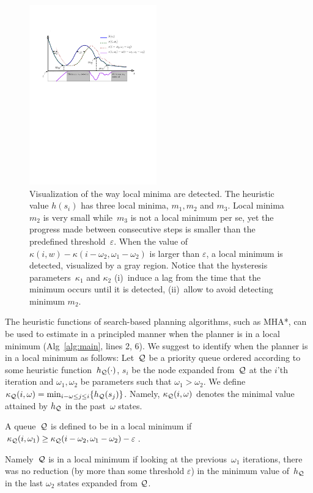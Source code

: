 \documentclass[conference]{IEEEtran}
\begin{document}
\begin{figure}[tb]
  \centering
  	\includegraphics[width=0.49\textwidth]{fig/local_min_detection_4.pdf}
  	\vspace{-5mm}
  \caption{
		Visualization of the way local minima are detected.
		The heuristic value $h(s_i)$ has three local minima, $m_1, m_2$ and $m_3$.
		Local minima $m_2$ is very small while~$m_3$ is not a local minimum per se, yet the progress made between consecutive steps is smaller than the predefined threshold~$\varepsilon$.
		When the value of $\kappa(i,w) -  \kappa(i-\omega_2,\omega_1-\omega_2)$ is larger than $\varepsilon$, a local minimum is detected, visualized by a gray region.
		Notice that the hysteresis parameters~$\kappa_1$ and $\kappa_2$ 
		(i)~induce a lag from the time that the minimum occurs until it is detected,
		(ii)~allow to avoid detecting minimum $m_2$.		
  	}
   	\label{fig:robot}
  	\vspace{-5mm}
\end{figure}

The heuristic functions of search-based planning algorithms, such as MHA*, can be used to estimate in a principled manner when the planner is in a local minimum (Alg~\ref{alg:main}, lines 2, 6). 
%
We suggest to identify when the planner is in a local minimum as follows:
Let~$\mathcal{Q}$ be a priority queue 
ordered according to some heuristic function~$h_{\mathcal{Q}}(\cdot)$,
$s_i$ be the node expanded from~$\mathcal{Q}$ at the $i$'th iteration and $\omega_1, \omega_2$ be parameters such that $\omega_1 > \omega_2$.
%
We define 
$\kappa_{\mathcal{Q}}(i, \omega) = \min_{i-\omega \leq j \leq i} \{ h_{\mathcal{Q}}(s_j)\}$.
Namely, $\kappa_{\mathcal{Q}}(i, \omega)$ denotes the minimal value attained by $h_{\mathcal{Q}}$ in the past~$\omega$ states. 
%
\begin{definition}
A queue~$\mathcal{Q}$ is defined to be in a local minimum if 
$\kappa_{\mathcal{Q}}(i, \omega_1) \geq \kappa_{\mathcal{Q}}(i - \omega_2, \omega_1 - \omega_2) - \varepsilon$.
\end{definition}
\noindent Namely~$\mathcal{Q}$ is in a local minimum if looking at the previous~$\omega_1$ iterations, 
there was no reduction 
(by more than some threshold $\varepsilon$) 
in the minimum value of~$h_{\mathcal{Q}}$ 
in the last $\omega_2$ states expanded from $\mathcal{Q}$.
\end{document}
